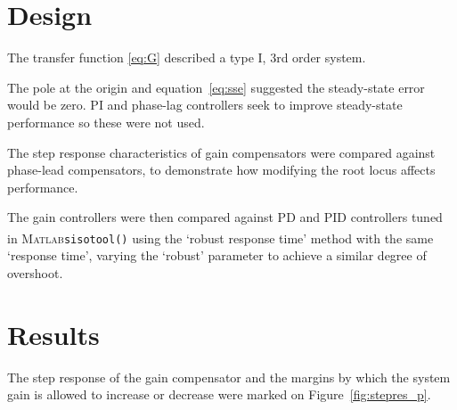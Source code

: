 \documentclass[a4paper,10pt,twocolumn]{article}
\newcommand{\Matlab}{\textsc{Matlab}\textsuperscript{\textregistered}\xspace}
\newcommand{\sisotool}{\texttt{sisotool()}\xspace}
\begin{document}
\section{Design}

The transfer function \eqref{eq:G} described a type I, 3rd order system.

The pole at the origin and equation~\eqref{eq:sse} suggested the steady-state error would be zero. PI and phase-lag controllers seek to improve steady-state performance so these were not used.

The step response characteristics of gain compensators were compared against phase-lead compensators, to demonstrate how modifying the root locus affects performance.

The gain controllers were then compared against PD and PID controllers tuned in \Matlab \sisotool using the `robust response time' method with the same `response time', varying the `robust' parameter to achieve a similar degree of overshoot.

\section{Results}

The step response of the gain compensator and the margins by which the system gain is allowed to increase or decrease were marked on Figure~\ref{fig:stepres_p}.
\end{document}
